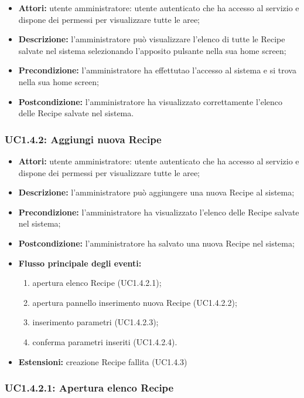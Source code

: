 \begin{itemize}
    \item \textbf{Attori:} utente amministratore: utente autenticato che ha accesso al servizio e dispone dei permessi per visualizzare tutte le aree;
    \item \textbf{Descrizione:} l'amministratore può visualizzare l'elenco di tutte le Recipe salvate nel sistema selezionando l'apposito pulsante nella sua home screen;
    \item \textbf{Precondizione:} l'amministratore ha effettutao l'accesso al sistema e si trova nella sua home screen;
    \item \textbf{Postcondizione:} l'amministratore ha visualizzato correttamente l'elenco delle Recipe salvate nel sistema.
\end{itemize}

\subsubsection{UC1.4.2: Aggiungi nuova Recipe}
\begin{itemize}
    \item \textbf{Attori:} utente amministratore: utente autenticato che ha accesso al servizio e dispone dei permessi per visualizzare tutte le aree;
    \item \textbf{Descrizione:} l'amministratore può aggiungere una nuova Recipe al sistema;
    \item \textbf{Precondizione:} l'amministratore ha visualizzato l'elenco delle Recipe salvate nel sistema;
    \item \textbf{Postcondizione:} l'amministratore ha salvato una nuova Recipe nel sistema;
	\item \textbf{Flusso principale degli eventi:}
    \begin{enumerate}
        \item apertura elenco Recipe (UC1.4.2.1);
        \item apertura pannello inserimento nuova Recipe (UC1.4.2.2);
        \item inserimento parametri (UC1.4.2.3);
        \item conferma parametri inseriti (UC1.4.2.4).
    \end{enumerate}
    \item \textbf{Estensioni:} creazione Recipe fallita (UC1.4.3)
\end{itemize}

\subsubsection{UC1.4.2.1: Apertura elenco Recipe}

